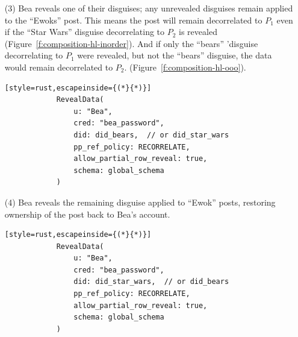 \begin{enumerate}[nosep]
    \item[(3)] Bea reveals one of their disguises; any unrevealed disguises remain applied to the ``Ewoks'' post.
    This means the post will remain decorrelated to $P_1$ even if the ``Star Wars''
    disguise decorrelating to $P_2$ is revealed
    (Figure~\ref{f:composition-hl-inorder}).
    And if only the ``bears'' 'disguise decorrelating to $P_1$ were revealed, but
    not the ``bears'' disguise, the data would remain decorrelated to $P_2$.
    (Figure~\ref{f:composition-hl-ooo}).

        \vspace{12pt}
        \begin{lstlisting}[style=rust,escapeinside={(*}{*)}]
            RevealData(
                u: "Bea", 
                cred: "bea_password",
                did: did_bears,  // or did_star_wars
                pp_ref_policy: RECORRELATE,
                allow_partial_row_reveal: true,
                schema: global_schema
            )
        \end{lstlisting}

    \item[(4)] Bea reveals the remaining disguise applied to ``Ewok'' posts,
        restoring ownership of the post back to Bea's account.

        \vspace{12pt}
        \begin{lstlisting}[style=rust,escapeinside={(*}{*)}]
            RevealData(
                u: "Bea", 
                cred: "bea_password",
                did: did_star_wars,  // or did_bears
                pp_ref_policy: RECORRELATE,
                allow_partial_row_reveal: true,
                schema: global_schema
            )
        \end{lstlisting}

\end{enumerate}



